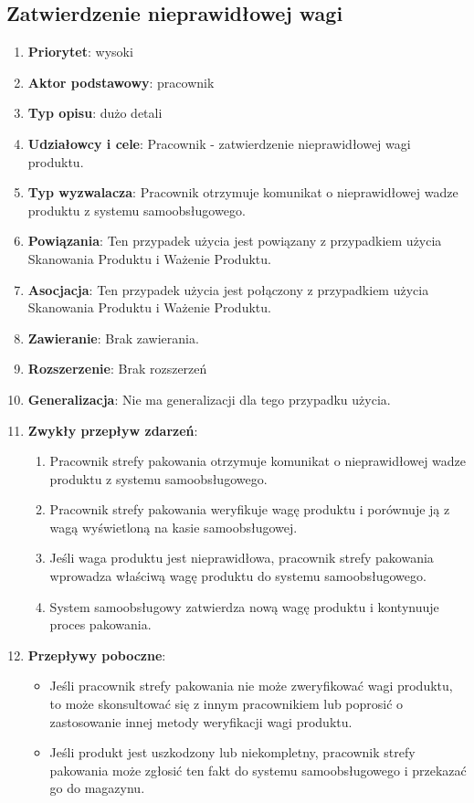 \documentclass{article}
\begin{document}
\subsection{Zatwierdzenie nieprawidłowej wagi}
\begin{enumerate}
\item \textbf{Priorytet}: wysoki
\item \textbf{Aktor podstawowy}: pracownik
\item \textbf{Typ opisu}: dużo detali
\item \textbf{Udziałowcy i cele}: Pracownik - zatwierdzenie nieprawidłowej wagi produktu.
\item \textbf{Typ wyzwalacza}: Pracownik otrzymuje komunikat o nieprawidłowej wadze produktu z systemu samoobsługowego.
\item \textbf{Powiązania}: Ten przypadek użycia jest powiązany z przypadkiem użycia Skanowania Produktu i Ważenie Produktu.
\item \textbf{Asocjacja}: Ten przypadek użycia jest połączony z przypadkiem użycia Skanowania Produktu i Ważenie Produktu.
\item \textbf{Zawieranie}: Brak zawierania.
\item \textbf{Rozszerzenie}: Brak rozszerzeń
\item \textbf{Generalizacja}: Nie ma generalizacji dla tego przypadku użycia.
\item \textbf{Zwykły przepływ zdarzeń}:
\begin{enumerate}
\item Pracownik strefy pakowania otrzymuje komunikat o nieprawidłowej wadze produktu z systemu samoobsługowego.
\item Pracownik strefy pakowania weryfikuje wagę produktu i porównuje ją z wagą wyświetloną na kasie samoobsługowej.
\item Jeśli waga produktu jest nieprawidłowa, pracownik strefy pakowania wprowadza właściwą wagę produktu do systemu samoobsługowego.
\item System samoobsługowy zatwierdza nową wagę produktu i kontynuuje proces pakowania.
\end{enumerate}
\item \textbf{Przepływy poboczne}:
\begin{itemize}
\item Jeśli pracownik strefy pakowania nie może zweryfikować wagi produktu, to może skonsultować się z innym pracownikiem lub poprosić o zastosowanie innej metody weryfikacji wagi produktu.
\item Jeśli produkt jest uszkodzony lub niekompletny, pracownik strefy pakowania może zgłosić ten fakt do systemu samoobsługowego i przekazać go do magazynu.
\end{itemize}
\end{enumerate}
\end{document}

